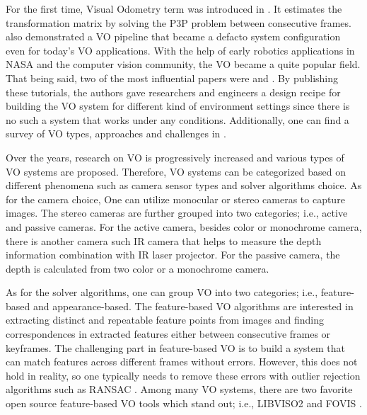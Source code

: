 \documentclass[12pt]{report}
\numberwithin{figure}{section}
\begin{document}
For the first time, Visual Odometry term was introduced in 
\parencite{Nister2004}. 
It estimates the transformation matrix by solving the P3P problem between 
consecutive frames. \cite{Nister2004} also demonstrated a VO pipeline that 
became a 
defacto system configuration even for today's VO applications. With the help 
of early robotics applications in NASA and the computer vision community, the 
VO 
became a quite popular field. That being said, two of the most influential 
papers were \parencite{Fraundorfer2012} and \parencite{Scaramuzza2011}. By 
publishing 
these tutorials, the authors gave researchers and engineers a 
design recipe 
for building the VO system for different kind of environment settings since 
there is no such a system that works under any conditions. Additionally, one 
can find a 
survey of VO types, approaches and challenges in \parencite{Aqel2016}.

Over the years, research on VO is progressively increased and various types of 
VO systems are proposed. Therefore, VO systems can be categorized based on 
different phenomena such as camera sensor types and solver algorithms choice. 
As for the camera choice, One can utilize monocular or stereo cameras to 
capture images. The stereo 
cameras are further grouped into two categories; i.e., active and passive 
cameras. For the active camera, besides color or monochrome camera, there is 
another camera such IR camera that helps to measure the depth information 
combination 
with IR laser projector. For the passive camera, the depth is calculated from 
two color or a monochrome camera. 

As for the solver algorithms, one can 
group VO into two categories; i.e., feature-based and appearance-based.
The feature-based VO algorithms are interested in extracting distinct and 
repeatable feature points from images and finding correspondences in extracted 
features either between consecutive frames or keyframes. The challenging part 
in feature-based VO is to build a system that can match features across 
different frames without errors. However, this does not hold in reality, so 
one typically needs to remove these errors with outlier rejection algorithms 
such as RANSAC \parencite{Fischler1981b}. Among many VO systems, there are two 
favorite open source feature-based VO tools which stand out; i.e., LIBVISO2 
\parencite{Geiger2011} and FOVIS \parencite{Huanga2011}. 
\end{document}
